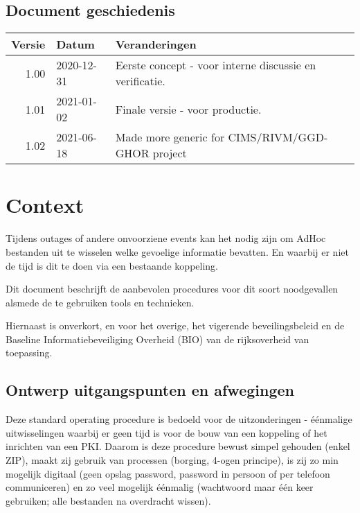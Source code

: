 \documentclass[11.0pt,twoside,openright]{report}
\begin{document}
\maketitle

\section*{Document geschiedenis}

\begin{tabular}{|r|l|l|}
\hline
Versie & Datum & Veranderingen \\
\hline
\hline
1.00 & 2020-12-31 & Eerste concept - voor interne discussie en verificatie. \\
\hline
1.01 & 2021-01-02 & Finale versie - voor productie. \\
\hline
1.02 & 2021-06-18 & Made more generic for CIMS/RIVM/GGD-GHOR project \\
\hline
\end{tabular}

\chapter{Context}

Tijdens outages of andere onvoorziene events kan het nodig zijn om AdHoc bestanden uit te wisselen welke gevoelige informatie bevatten. En waarbij er niet de tijd is dit te doen via een bestaande koppeling. 

Dit document beschrijft de aanbevolen procedures voor dit soort noodgevallen alsmede de te gebruiken tools en technieken.

Hiernaast is onverkort, en voor het overige, het vigerende beveilingsbeleid en de Baseline Informatiebeveiliging Overheid (BIO) van de rijksoverheid van toepassing.

\section*{Ontwerp uitgangspunten en afwegingen}

Deze standard operating procedure is bedoeld voor de uitzonderingen - éénmalige uitwisselingen waarbij er geen tijd is voor de bouw van een koppeling of het inrichten van een PKI. Daarom is deze procedure bewust simpel gehouden (enkel ZIP), maakt zij gebruik van processen (borging, 4-ogen principe), is zij zo min mogelijk digitaal (geen opslag password, password in persoon of per telefoon communiceren) en zo veel mogelijk éénmalig (wachtwoord maar één keer gebruiken; alle bestanden na overdracht wissen).
\pagebreak
\end{document}
